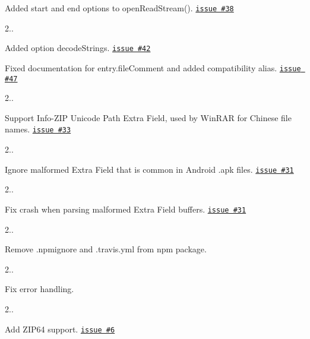 \begin{DoxyItemize}
\begin{DoxyItemize}
\item Added {\ttfamily start} and {\ttfamily end} options to {\ttfamily open\+Read\+Stream()}. \href{https://github.com/thejoshwolfe/yauzl/issues/38}{\tt issue \#38}
\end{DoxyItemize}
\item 2..
\begin{DoxyItemize}
\item Added option {\ttfamily decode\+Strings}. \href{https://github.com/thejoshwolfe/yauzl/issues/42}{\tt issue \#42}
\item Fixed documentation for {\ttfamily entry.\+file\+Comment} and added compatibility alias. \href{https://github.com/thejoshwolfe/yauzl/issues/47}{\tt issue \#47}
\end{DoxyItemize}
\item 2..
\begin{DoxyItemize}
\item Support Info-\/\+Z\+IP Unicode Path Extra Field, used by Win\+R\+AR for Chinese file names. \href{https://github.com/thejoshwolfe/yauzl/issues/33}{\tt issue \#33}
\end{DoxyItemize}
\item 2..
\begin{DoxyItemize}
\item Ignore malformed Extra Field that is common in Android .apk files. \href{https://github.com/thejoshwolfe/yauzl/issues/31}{\tt issue \#31}
\end{DoxyItemize}
\item 2..
\begin{DoxyItemize}
\item Fix crash when parsing malformed Extra Field buffers. \href{https://github.com/thejoshwolfe/yauzl/issues/31}{\tt issue \#31}
\end{DoxyItemize}
\item 2..
\begin{DoxyItemize}
\item Remove .npmignore and .travis.\+yml from npm package.
\end{DoxyItemize}
\item 2..
\begin{DoxyItemize}
\item Fix error handling.
\end{DoxyItemize}
\item 2..
\begin{DoxyItemize}
\item Add Z\+I\+P64 support. \href{https://github.com/thejoshwolfe/yauzl/issues/6}{\tt issue \#6}

\end{DoxyItemize}
\end{DoxyItemize}
